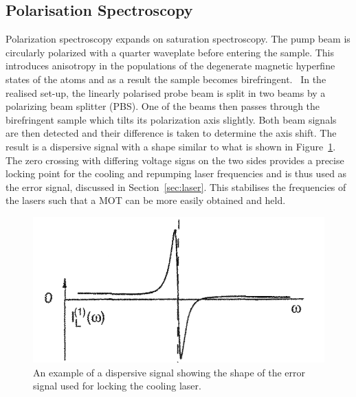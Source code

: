 \documentclass[twocolumn]{article}
\begin{document}
\subsection{Polarisation Spectroscopy} \label{sec:pol} %
Polarization spectroscopy expands on saturation spectroscopy. The pump beam is circularly polarized with a quarter waveplate before entering the sample. This introduces anisotropy in the populations of the degenerate magnetic hyperfine states of the atoms and as a result the sample becomes birefringent.~\cite{demtroder} In the realised set-up, the linearly polarised probe beam is split in two beams by a polarizing beam splitter (PBS). One of the beams then passes through the birefringent sample which tilts its polarization axis slightly. Both beam signals are then detected and their difference is taken to determine the axis shift. The result is a dispersive signal with a shape similar to what is shown in Figure~\ref{fig:Dispersive}. The zero crossing with differing voltage signs on the two sides provides a precise locking point for the cooling and repumping laser frequencies and is thus used as the error signal, discussed in Section~\ref{sec:laser}. This stabilises the frequencies of the lasers such that a MOT can be more easily obtained and held.
\begin{figure} [!h]
\centering
\includegraphics[width=1\linewidth]{Images/Dispersive.png}
\caption{An example of a dispersive signal showing the shape of the error signal used for locking the cooling laser.~\cite{demtroder}}
\label{fig:Dispersive}
\end{figure}
\end{document}
